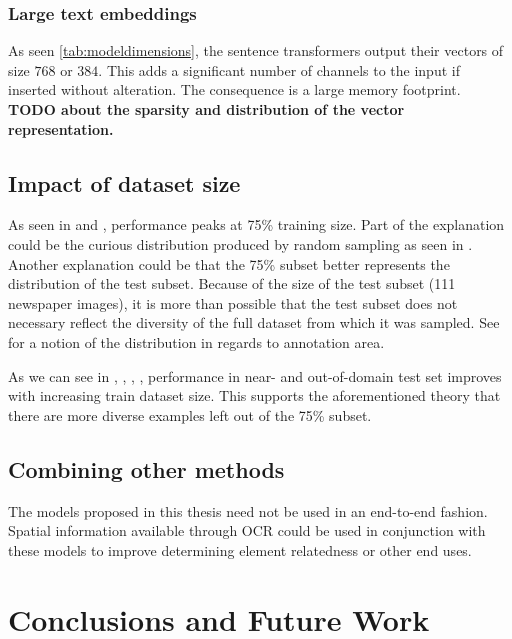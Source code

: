 \documentclass[oneside, english, bibtex]{kththesis}
\begin{document}
\subsection{Large text embeddings} 

As seen \autoref{tab:modeldimensions}, the sentence transformers output their vectors of size $768$ or $384$. This adds a significant number of channels to the input if inserted without alteration. The consequence is a large memory footprint. \textbf{TODO about the sparsity and distribution of the vector representation.}

\section{Impact of dataset size}

As seen in  and , performance peaks at 75\% training size. Part of the explanation could be the curious distribution produced by random sampling as seen in . Another explanation could be that the 75\% subset better represents the distribution of the test subset. Because of the size of the test subset (111 newspaper images), it is more than possible that the test subset does not necessary reflect the diversity of the full dataset from which it was sampled. See  for a notion of the distribution in regards to annotation area.

As we can see in , , , , performance in near- and out-of-domain test set improves with increasing train dataset size. This supports the aforementioned theory that there are more diverse examples left out of the 75\% subset.

\section{Combining other methods}

The models proposed in this thesis need not be used in an end-to-end fashion. Spatial information available through OCR could be used in conjunction with these models to improve determining element relatedness or other end uses. 

\chapter{Conclusions and Future Work}
\label{ch:conc}
\end{document}
